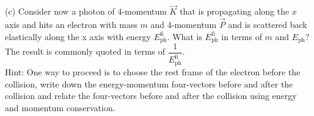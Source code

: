 \begin{example}
(c) Consider now a photon of 4-momentum $\vec{K}$ that is propagating along the $x$ axis and hits an electron with mass $m$ and 4-momentum $\vec{P}$ and is scattered back elastically along the x axis with energy $E_{\mathrm{ph}}^{\mathrm{fi}}.$ What is $E_\mathrm{ph}^\mathrm{fi}$ in terms of $m$ and $E_\mathrm{ph}?$ The result is commonly quoted in terms of $\dfrac{1}{E_\mathrm{ph}^\mathrm{fi}}$.\\
Hint: One way to proceed is to choose the rest frame of the electron before the collision, write down the energy-momentum four-vectors before and after the collision and relate the four-vectors before and after the collision using energy and momentum conservation.
\end{example}